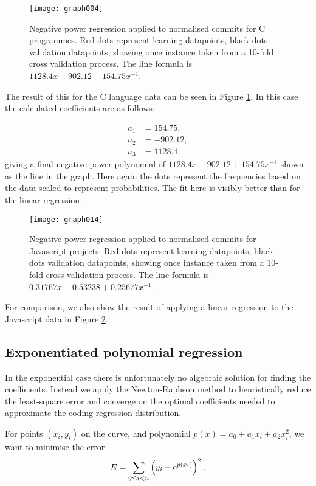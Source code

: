 \documentclass[10pt,journal,compsoc]{IEEEtran}
\begin{document}
\begin{figure}[t]
\centering
\texttt{[image: graph004]}%
\caption{\label{fig:c-negpow}Negative power regression applied to normalised commits for C programmes. Red dots represent learning datapoints, black dots validation datapoints, showing once instance taken from a 10-fold cross validation process. The line formula is $1128.4 x - 902.12 + 154.75 x^{-1}$.}
\end{figure}

The result of this for the C language data can be seen in Figure \ref{fig:c-negpow}. In this case the calculated coefficients are as follows:

\begin{align*}
a_1 & = 154.75, \\
a_2 & = -902.12, \\
a_3 & = 1128.4,
\end{align*}
giving a final negative-power polynomial of $1128.4 x - 902.12 + 154.75 x^{-1}$ shown as the line in the graph. Here again the dots represent the frequencies based on the data scaled to represent probabilities. The fit here is visibly better than for the linear regression.

\begin{figure}[t]
\centering
\texttt{[image: graph014]}%
\caption{\label{fig:javascript-negpow}Negative power regression applied to normalised commits for Javascript projects. Red dots represent learning datapoints, black dots validation datapoints, showing once instance taken from a 10-fold cross validation process. The line formula is $0.31767 x - 0.53238 + 0.25677 x^{-1}$.}
\end{figure}

For comparison, we also show the result of applying a linear regression to the Javascript data in Figure \ref{fig:javascript-negpow}.

\subsection{Exponentiated polynomial regression}

In the exponential case there is unfortunately no algebraic solution for finding the coefficients. Instead we apply the Newton-Raphson method to heuristically reduce the least-square error and converge on the optimal coefficients needed to approximate the coding regression distribution.

For points $(x_i, y_i)$ on the curve, and polynomial $p(x) = a_0 + a_1 x_i + a_2 x_i^2$, we want to minimise the error
$$
E = \sum_{0 \le i < n} \left( y_i - {\rm e}^{p(x_i)} \right)^2 .
$$
\end{document}
